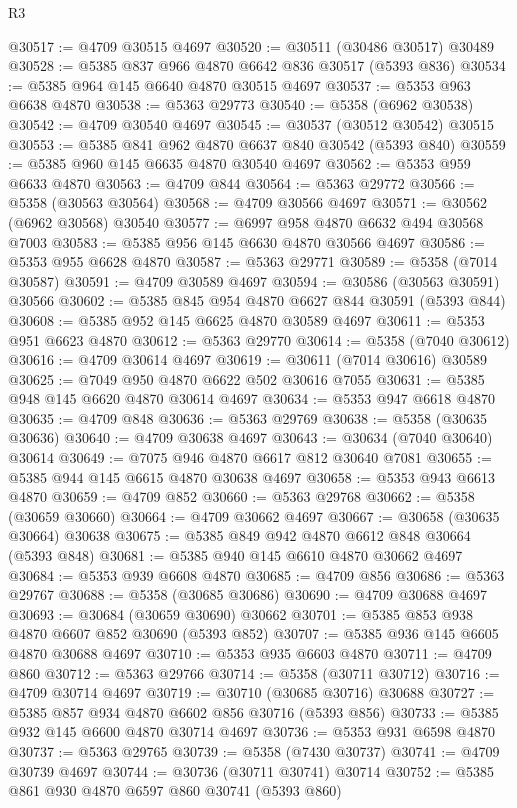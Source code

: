 \begin{lexlean}{R3}
\begin{coremodule}
@30517 := @4709 @30515 @4697
@30520 := @30511 (@30486 @30517) @30489
@30528 := @5385 @837 @966 @4870 @6642 @836 @30517 (@5393 @836)
@30534 := @5385 @964 @145 @6640 @4870 @30515 @4697
@30537 := @5353 @963 @6638 @4870
@30538 := @5363 @29773
@30540 := @5358 (@6962 @30538)
@30542 := @4709 @30540 @4697
@30545 := @30537 (@30512 @30542) @30515
@30553 := @5385 @841 @962 @4870 @6637 @840 @30542 (@5393 @840)
@30559 := @5385 @960 @145 @6635 @4870 @30540 @4697
@30562 := @5353 @959 @6633 @4870
@30563 := @4709 @844
@30564 := @5363 @29772
@30566 := @5358 (@30563 @30564)
@30568 := @4709 @30566 @4697
@30571 := @30562 (@6962 @30568) @30540
@30577 := @6997 @958 @4870 @6632 @494 @30568 @7003
@30583 := @5385 @956 @145 @6630 @4870 @30566 @4697
@30586 := @5353 @955 @6628 @4870
@30587 := @5363 @29771
@30589 := @5358 (@7014 @30587)
@30591 := @4709 @30589 @4697
@30594 := @30586 (@30563 @30591) @30566
@30602 := @5385 @845 @954 @4870 @6627 @844 @30591 (@5393 @844)
@30608 := @5385 @952 @145 @6625 @4870 @30589 @4697
@30611 := @5353 @951 @6623 @4870
@30612 := @5363 @29770
@30614 := @5358 (@7040 @30612)
@30616 := @4709 @30614 @4697
@30619 := @30611 (@7014 @30616) @30589
@30625 := @7049 @950 @4870 @6622 @502 @30616 @7055
@30631 := @5385 @948 @145 @6620 @4870 @30614 @4697
@30634 := @5353 @947 @6618 @4870
@30635 := @4709 @848
@30636 := @5363 @29769
@30638 := @5358 (@30635 @30636)
@30640 := @4709 @30638 @4697
@30643 := @30634 (@7040 @30640) @30614
@30649 := @7075 @946 @4870 @6617 @812 @30640 @7081
@30655 := @5385 @944 @145 @6615 @4870 @30638 @4697
@30658 := @5353 @943 @6613 @4870
@30659 := @4709 @852
@30660 := @5363 @29768
@30662 := @5358 (@30659 @30660)
@30664 := @4709 @30662 @4697
@30667 := @30658 (@30635 @30664) @30638
@30675 := @5385 @849 @942 @4870 @6612 @848 @30664 (@5393 @848)
@30681 := @5385 @940 @145 @6610 @4870 @30662 @4697
@30684 := @5353 @939 @6608 @4870
@30685 := @4709 @856
@30686 := @5363 @29767
@30688 := @5358 (@30685 @30686)
@30690 := @4709 @30688 @4697
@30693 := @30684 (@30659 @30690) @30662
@30701 := @5385 @853 @938 @4870 @6607 @852 @30690 (@5393 @852)
@30707 := @5385 @936 @145 @6605 @4870 @30688 @4697
@30710 := @5353 @935 @6603 @4870
@30711 := @4709 @860
@30712 := @5363 @29766
@30714 := @5358 (@30711 @30712)
@30716 := @4709 @30714 @4697
@30719 := @30710 (@30685 @30716) @30688
@30727 := @5385 @857 @934 @4870 @6602 @856 @30716 (@5393 @856)
@30733 := @5385 @932 @145 @6600 @4870 @30714 @4697
@30736 := @5353 @931 @6598 @4870
@30737 := @5363 @29765
@30739 := @5358 (@7430 @30737)
@30741 := @4709 @30739 @4697
@30744 := @30736 (@30711 @30741) @30714
@30752 := @5385 @861 @930 @4870 @6597 @860 @30741 (@5393 @860)

\end{coremodule}
\end{lexlean}
